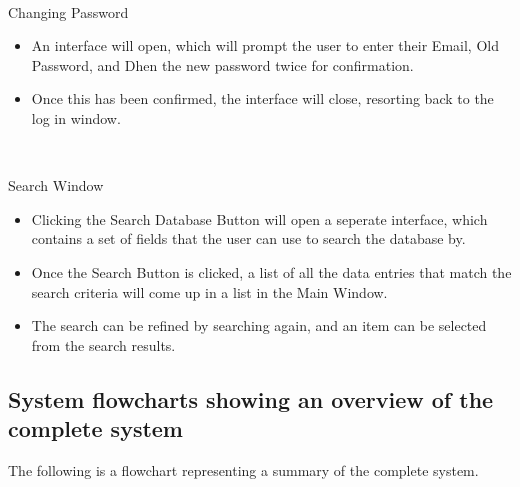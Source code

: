 \

Changing Password
\begin{itemize}
    \item An interface will open, which will prompt the user to enter their Email, Old Password, and Dhen the new password twice for confirmation.
    \item Once this has been confirmed, the interface will close, resorting back to the log in window.
\end{itemize}

\

Search Window
\begin{itemize}
    \item Clicking the Search Database Button will open a seperate interface, which contains a set of fields that the user can use to search the database by.
    \item Once the Search Button is clicked, a list of all the data entries that match the search criteria will come up in a list in the Main Window.
    \item The search can be refined by searching again, and an item can be selected from the search results.
\end{itemize}

\subsection{System flowcharts showing an overview of the complete system}

The following is a flowchart representing a summary of the complete system.

